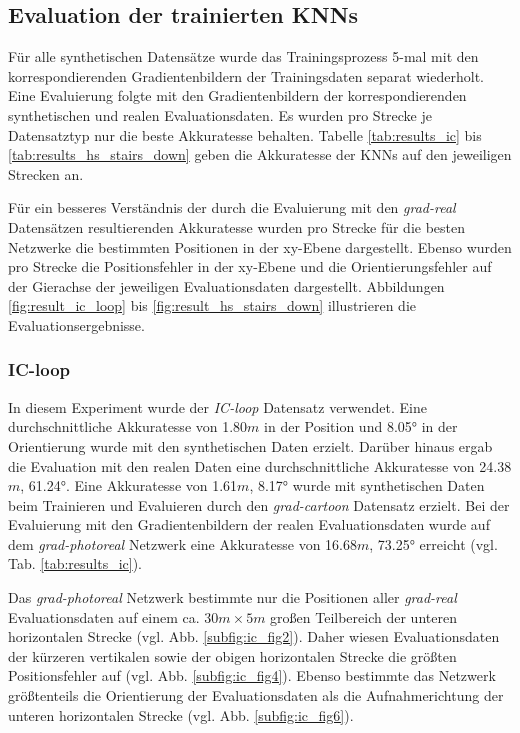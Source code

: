 \subsection{Evaluation der trainierten KNNs}
Für alle synthetischen Datensätze wurde das Trainingsprozess 5-mal mit den korrespondierenden Gradientenbildern der Trainingsdaten separat wiederholt. Eine Evaluierung folgte mit den Gradientenbildern der korrespondierenden synthetischen und realen Evaluationsdaten. Es wurden pro Strecke je Datensatztyp nur die beste Akkuratesse behalten. Tabelle \ref{tab:results_ic} bis \ref{tab:results_hs_stairs_down} geben die Akkuratesse der KNNs auf den jeweiligen Strecken an. 

Für ein besseres Verständnis der durch die Evaluierung mit den \textit{grad-real} Datensätzen resultierenden Akkuratesse wurden pro Strecke für die besten Netzwerke die bestimmten Positionen in der xy-Ebene dargestellt. Ebenso wurden pro Strecke die Positionsfehler in der xy-Ebene und die Orientierungsfehler auf der Gierachse der jeweiligen Evaluationsdaten dargestellt. Abbildungen \ref{fig:result_ic_loop} bis \ref{fig:result_hs_stairs_down} illustrieren die Evaluationsergebnisse.


\subsubsection{IC-loop}
\label{subsubsec:ic_loop}

In diesem Experiment wurde der \textit{IC-loop} Datensatz verwendet. Eine durchschnittliche Akkuratesse von 1.80$m$ in der Position und 8.05° in der Orientierung wurde mit den synthetischen Daten erzielt. Darüber hinaus ergab die Evaluation mit den realen Daten eine durchschnittliche Akkuratesse von 24.38$m$, 61.24°. Eine Akkuratesse von 1.61$m$, 8.17° wurde mit synthetischen Daten beim Trainieren und Evaluieren durch den \textit{grad-cartoon} Datensatz erzielt. Bei der Evaluierung mit den Gradientenbildern der realen Evaluationsdaten wurde auf dem \textit{grad-photoreal} Netzwerk eine Akkuratesse von 16.68$m$, 73.25° erreicht (vgl. Tab. \ref{tab:results_ic}). 

Das \textit{grad-photoreal} Netzwerk bestimmte nur die Positionen aller \textit{grad-real} Evaluationsdaten auf einem ca. $30m \times 5m$ großen Teilbereich der unteren horizontalen Strecke (vgl. Abb. \ref{subfig:ic_fig2}). Daher wiesen Evaluationsdaten der kürzeren vertikalen sowie der obigen horizontalen Strecke die größten Positionsfehler auf (vgl. Abb. \ref{subfig:ic_fig4}). Ebenso bestimmte das Netzwerk größtenteils die Orientierung der Evaluationsdaten als die Aufnahmerichtung der unteren horizontalen Strecke (vgl. Abb. \ref{subfig:ic_fig6}).

